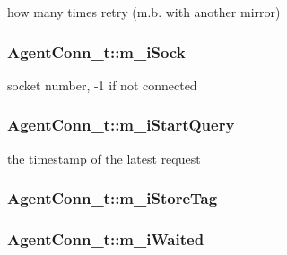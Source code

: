 how many times retry (m.\-b. with another mirror) 

\hypertarget{structAgentConn__t_a839dd9a3b8c453d19a350c2c319cc9e0}{
\subsubsection[{m\-\_\-i\-Sock}]{ Agent\-Conn\-\_\-t\-::m\-\_\-i\-Sock}}\label{structAgentConn__t_a839dd9a3b8c453d19a350c2c319cc9e0}


socket number, -\/1 if not connected 

\hypertarget{structAgentConn__t_a422ec8cb29794eda43e0fb8941fcab86}{
\subsubsection[{m\-\_\-i\-Start\-Query}]{ Agent\-Conn\-\_\-t\-::m\-\_\-i\-Start\-Query}}\label{structAgentConn__t_a422ec8cb29794eda43e0fb8941fcab86}


the timestamp of the latest request 

\hypertarget{structAgentConn__t_a6f256b258881ec414716c06a94c97e50}{
\subsubsection[{m\-\_\-i\-Store\-Tag}]{ Agent\-Conn\-\_\-t\-::m\-\_\-i\-Store\-Tag}}\label{structAgentConn__t_a6f256b258881ec414716c06a94c97e50}
\hypertarget{structAgentConn__t_ad8d236185b0ff03980532eb039ae0990}{
\subsubsection[{m\-\_\-i\-Waited}]{ Agent\-Conn\-\_\-t\-::m\-\_\-i\-Waited}}\label{structAgentConn__t_ad8d236185b0ff03980532eb039ae0990}


